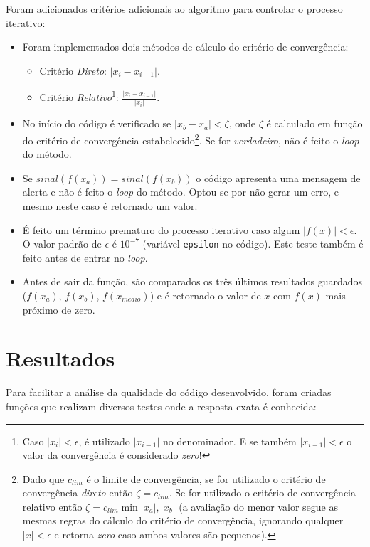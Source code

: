 \documentclass[final,5p]{elsarticle}
\numberwithin{equation}{section}
\begin{document}
    Foram adicionados critérios adicionais ao algoritmo para controlar o processo iterativo:

    \begin{itemize}
        \item Foram implementados dois métodos de cálculo do critério de convergência:
        \begin{itemize}
            \item Critério \emph{Direto}: $|x_i - x_{i-1}|$.
            \item Critério \emph{Relativo}\footnote{Caso $|x_i| < \epsilon$, é utilizado $|x_{i-1}|$ no denominador. E se também $|x_{i-1}| < \epsilon$ o valor da convergência é considerado \emph{zero}!}: $\frac{|x_i - x_{i-1}|}{|x_i|}$.
        \end{itemize}
        \item No início do código é verificado se $|x_b - x_a| < \zeta$, onde $\zeta$ é calculado em função do critério de convergência estabelecido\footnote{Dado que $c_{lim}$ é o limite de convergência, se for utilizado o critério de convergência \emph{direto} então $\zeta = c_{lim}$. Se for utilizado o critério de convergência relativo então $\zeta = c_{lim} \min{|x_a|,|x_b|}$ (a avaliação do menor valor segue as mesmas regras do cálculo do critério de convergência, ignorando qualquer $|x| < \epsilon$ e retorna \emph{zero} caso ambos valores são pequenos).}. Se for \emph{verdadeiro}, não é feito o \emph{loop} do método. 
        \item Se $sinal(f(x_a)) = sinal(f(x_b))$ o código apresenta uma mensagem de alerta e não é feito o \emph{loop} do método. Optou-se por não gerar um erro, e mesmo neste caso é retornado um valor.
        \item É feito um término prematuro do processo iterativo caso algum $|f(x)| < \epsilon$. O valor padrão de $\epsilon$ é $10^{-7}$ (variável \verb|epsilon| no código). Este teste também é feito antes de entrar no \emph{loop}.
        \item Antes de sair da função, são comparados os três últimos resultados guardados ($f(x_a)$, $f(x_b)$, $f(x_{medio})$) e é retornado o valor de $x$ com $f(x)$ mais próximo de zero.
    \end{itemize}
    
    \section{Resultados}
    
    Para facilitar a análise da qualidade do código desenvolvido, foram criadas funções que realizam diversos testes onde a resposta exata é conhecida:
\end{document}
